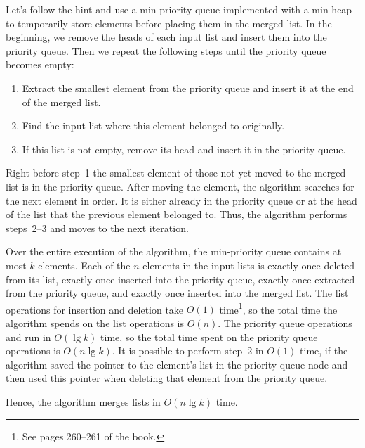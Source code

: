 Let's follow the hint and use a min-priority queue implemented with a min-heap to temporarily store elements before placing them in the merged list.
In the beginning, we remove the heads of each input list and insert them into the priority queue.
Then we repeat the following steps until the priority queue becomes empty:
\begin{enumerate}
    \item Extract the smallest element from the priority queue and insert it at the end of the merged list.
    \item Find the input list where this element belonged to originally.
    \item If this list is not empty, remove its head and insert it in the priority queue.
\end{enumerate}
Right before step~1 the smallest element of those not yet moved to the merged list is in the priority queue.
After moving the element, the algorithm searches for the next element in order.
It is either already in the priority queue or at the head of the list that the previous element belonged to.
Thus, the algorithm performs steps~2--3 and moves to the next iteration.

Over the entire execution of the algorithm, the min-priority queue contains at most $k$ elements.
Each of the $n$ elements in the input lists is exactly once deleted from its list, exactly once inserted into the priority queue, exactly once extracted from the priority queue, and exactly once inserted into the merged list.
The list operations for insertion and deletion take $O(1)$ time\footnote{See pages 260--261 of the book.}, so the total time the algorithm spends on the list operations is $O(n)$.
The priority queue operations  and  run in $O(\lg k)$ time, so the total time spent on the priority queue operations is $O(n\lg k)$.
It is possible to perform step~2 in $O(1)$ time, if the algorithm saved the pointer to the element's list in the priority queue node and then used this pointer when deleting that element from the priority queue.

Hence, the algorithm merges lists in $O(n\lg k)$ time.
